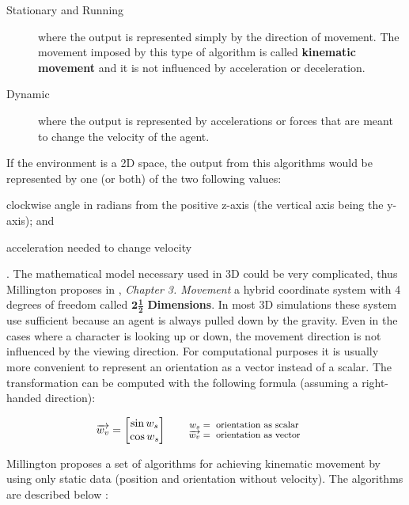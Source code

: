 \begin{description}
  \item [Stationary and Running] where the output is represented simply by the 
  direction of movement. The movement imposed by this type of algorithm is called
  \textbf{kinematic movement} and it is not influenced by acceleration or
  deceleration.
  \item [Dynamic] where the output is represented by accelerations or forces
  that are meant to change the velocity of the agent.
\end{description}

If the environment is a 2D space, the output from this algorithms would
  be represented by one (or both) of the two following values:
\begin{inparaenum}
\item clockwise angle in radians from the positive z-axis (the vertical axis 
being the y-axis); and
\item acceleration needed to change velocity
\end{inparaenum}.
The mathematical model necessary used in 3D could be very complicated, thus 
Millington proposes in \cite{ai-games}, \textit{Chapter 3. Movement} a hybrid 
coordinate system with 4 degrees of freedom called $\mathbf{2\frac{1}{2}}$
\textbf{Dimensions}. In most 3D simulations these system use sufficient because 
an agent is always pulled down by the gravity. Even in the cases where a character
is looking up or down, the movement direction is not influenced by the viewing 
direction. For computational purposes it is usually more convenient to represent
an orientation as a vector instead of a scalar. The transformation can be computed
with the following formula (assuming a right-handed direction):

\begin{equation}
\overrightarrow {w_{v}} = 
  \begin{bmatrix}
\sin w_{s} \\ \cos w_{s}
  \end{bmatrix}
\qquad\parbox{4.0cm}{\footnotesize$\begin{aligned} 
  w_{s} &= \text{ orientation as scalar}
  \\[-1.0ex] \overrightarrow {w_{v}} &= \text{ orientation as vector}
  \end{aligned}$}
\label{eqn:scalar-to-vector}
\end{equation}

Millington proposes a set of algorithms for achieving kinematic movement by 
using only static data (position and orientation without velocity). The algorithms
are described below \cite{ai-games}:


